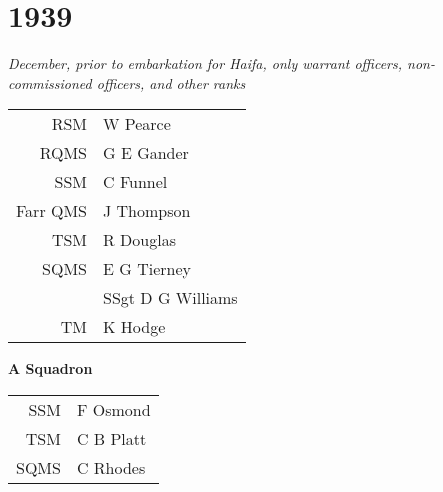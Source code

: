 \chapter*{1939}

\vspace*{10mm}

\begin{center}
  \textit{December, prior to embarkation for Haifa, only warrant officers, non-commissioned officers, and other ranks}
\end{center}

\vspace*{10mm}

\begin{center}
  \begin{tabular}{rl}
    RSM & W Pearce \\
    RQMS & G E Gander \\
    SSM & C Funnel \\
    Farr QMS & J Thompson \\
    TSM & R Douglas \\
    SQMS & E G Tierney \\
    & SSgt D G Williams \\
    TM & K Hodge \\
  \end{tabular}
\end{center}

\vspace*{10mm}

\begin{center}
  \Large
  \textbf{A Squadron}
\end{center}

\begin{center}
  \begin{tabular}{rl}
    SSM & F Osmond \\
    TSM & C B Platt \\
    SQMS & C Rhodes \\
  \end{tabular}
\end{center}

